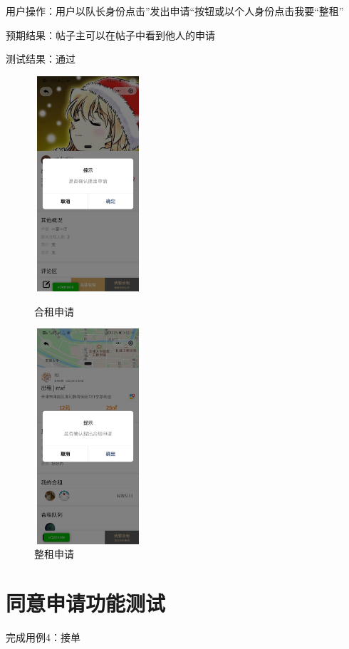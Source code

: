    用户操作：用户以队长身份点击”发出申请“按钮或以个人身份点击我要“整租”
   
   预期结果：帖子主可以在帖子中看到他人的申请
   
   测试结果：通过
   \newpage 
   \begin{figure}[htbp]
       \centering
       \begin{minipage}[t]{0.48\textwidth}
       \centering
       \includegraphics[width=4cm,height=8cm]{test/image/test44.png} 
    
      \caption{合租申请} 
    \end{minipage}
      \begin{minipage}[t]{0.48\textwidth}
        \centering
        \includegraphics[width=4cm,height=8cm]{test/image/test45.png} 
     
       \caption{整租申请} 
        \end{minipage}
       \end{figure}
    
   \section{同意申请功能测试}
   完成用例4：接单

